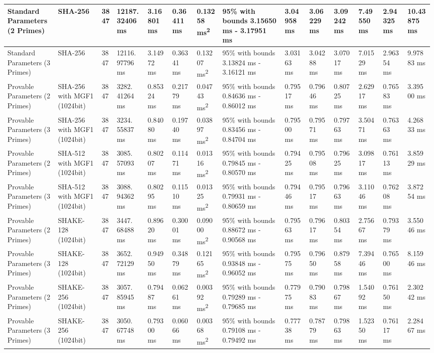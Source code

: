 \documentclass[]{final_report}
\theoremstyle{definition}
\begin{document}
\begin{landscape}
\begin{longtable}{|p{2.3cm}|p{1.8cm}|p{1.0cm}|p{1.7cm}|p{1.4cm}|p{1.5cm}|p{1.8cm}|p{1.5cm}|p{1.43cm}|p{1.5cm}|p{1.3cm}|p{1.4cm}|p{1.3cm}|p{1.3cm}|}
\hline
\endlastfoot
Standard Parameters (2 Primes) & SHA-256 & 3847 & 12187.
32406 ms & 3.16801 ms & 0.36411 ms & 0.13258 ms\textsuperscript{2} & 95\% with bounds 3.15650 ms - 3.17951 ms & 3.04958 ms & 3.06229 ms & 3.09242 ms & 7.49550 ms & 2.94325 ms & 10.43875 ms \\
\hline
Standard Parameters (3 Primes) & SHA-256 & 3847 & 12116.
97796 ms & 3.14972 ms & 0.36341 ms & 0.13207 ms\textsuperscript{2} & 95\% with bounds 3.13824 ms - 3.16121 ms & 3.03163 ms & 3.04288 ms & 3.07017 ms & 7.01529 ms & 2.96354 ms & 9.97883 ms \\
\hline
Provable Parameters (2 Primes) & SHA-256 with MGF1 (1024bit) & 3847 & 3282.
41264 ms & 0.85324 ms & 0.21779 ms & 0.04743 ms\textsuperscript{2} & 95\% with bounds 0.84636 ms - 0.86012 ms & 0.79517 ms & 0.79646 ms & 0.80725 ms & 2.62917 ms & 0.76583 ms & 3.39500 ms \\
\hline
Provable Parameters (3 Primes) & SHA-256 with MGF1 (1024bit) & 3847 & 3234.
55837 ms & 0.84080 ms & 0.19740 ms & 0.03897 ms\textsuperscript{2} & 95\% with bounds 0.83456 ms - 0.84704 ms & 0.79500 ms & 0.79571 ms & 0.79763 ms & 3.50471 ms & 0.76363 ms & 4.26833 ms \\
\hline
Provable Parameters (2 Primes) & SHA-512 with MGF1 (1024bit) & 3847 & 3085.
57093 ms & 0.80207 ms & 0.11471 ms & 0.01316 ms\textsuperscript{2} & 95\% with bounds 0.79845 ms - 0.80570 ms & 0.79425 ms & 0.79508 ms & 0.79625 ms & 3.09817 ms & 0.76113 ms & 3.85929 ms \\
\hline
Provable Parameters (3 Primes) & SHA-512 with MGF1 (1024bit) & 3847 & 3088.
94362 ms & 0.80295 ms & 0.11510 ms & 0.01325 ms\textsuperscript{2} & 95\% with bounds 0.79931 ms - 0.80659 ms & 0.79446 ms & 0.79517 ms & 0.79663 ms & 3.11046 ms & 0.76208 ms & 3.87254 ms \\
\hline
Provable Parameters (2 Primes) & SHAKE-128 (1024bit) & 3847 & 3447.
68488 ms & 0.89620 ms & 0.30001 ms & 0.09000 ms\textsuperscript{2} & 95\% with bounds 0.88672 ms - 0.90568 ms & 0.79563 ms & 0.79617 ms & 0.80354 ms & 2.75667 ms & 0.79379 ms & 3.55046 ms \\
\hline
Provable Parameters (3 Primes) & SHAKE-128 (1024bit) & 3847 & 3652.
72129 ms & 0.94950 ms & 0.34879 ms & 0.12165 ms\textsuperscript{2} & 95\% with bounds 0.93848 ms - 0.96052 ms & 0.79575 ms & 0.79650 ms & 0.87958 ms & 7.39446 ms & 0.76500 ms & 8.15946 ms \\
\hline
Provable Parameters (2 Primes) & SHAKE-256 (1024bit) & 3847 & 3057.
85945 ms & 0.79487 ms & 0.06261 ms & 0.00392 ms\textsuperscript{2} & 95\% with bounds 0.79289 ms - 0.79685 ms & 0.77975 ms & 0.79083 ms & 0.79867 ms & 1.54092 ms & 0.76150 ms & 2.30242 ms \\
\hline
Provable Parameters (3 Primes) & SHAKE-256 (1024bit) & 3847 & 3050.
67748 ms & 0.79300 ms & 0.06066 ms & 0.00368 ms\textsuperscript{2} & 95\% with bounds 0.79108 ms - 0.79492 ms & 0.77738 ms & 0.78779 ms & 0.79863 ms & 1.52350 ms & 0.76117 ms & 2.28467 ms \\
\hline




\end{longtable}
\end{landscape}
\end{document}
